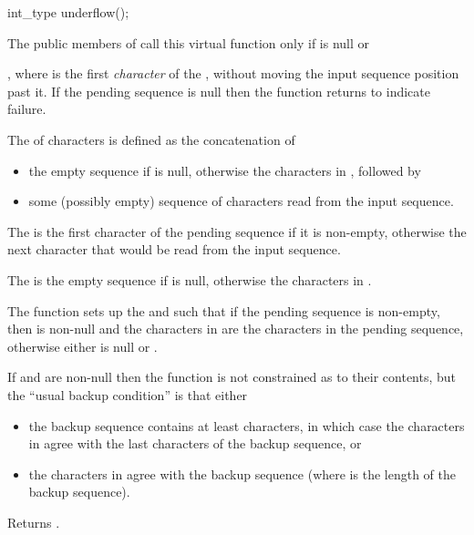 %
\begin{itemdecl}
int_type underflow();
\end{itemdecl}

\begin{itemdescr}
\pnum
\remarks
The public members of
call this virtual function only if
is null or

\pnum
\returns
{},
where  is the first
\textit{character}
of the
,
without moving the input sequence position past it.
If the pending sequence is null then the function returns
to indicate failure.

\pnum
The
of characters is defined as the concatenation of
\begin{itemize}
\item the empty sequence if  is null, otherwise the
characters in
,
followed by
\item
some (possibly empty) sequence of characters read from the input sequence.
\end{itemize}

\pnum
The
is
the first character of the pending sequence if it is non-empty,
otherwise
the next character that would be read from the input sequence.

\pnum
The
is the empty sequence if  is null, otherwise the
characters in
.

\pnum
\effects
The function sets up the
and
such that
if the pending sequence is non-empty, then
is non-null and
the characters in  are
the characters in the pending sequence,
otherwise
either 
is null or
.

\pnum
If
and
are non-null then the function is not constrained as to their contents, but the ``usual backup condition'' is that either
\begin{itemize}
\item
the backup sequence contains at least
characters, in which case the characters in
agree with the last
characters of the backup sequence, or
\item
the characters in 
agree with the backup sequence (where  is the length of the backup sequence).
\end{itemize}

\pnum
{}
Returns
.
\end{itemdescr}

